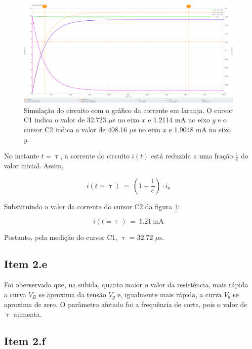 \documentclass[11pt]{article}
\begin{document}
\begin{figure}[h!]
  \centering
  \includegraphics[width=\textwidth]{fig/2-d}
  \caption{Simulação do circuito com o gráfico da corrente em laranja. O cursor C1 indica o valor de 32.723 $\mu$s no eixo $x$ e 1.2114 mA no eixo $y$ e o cursor C2 indica o valor de 408.16 $\mu$s no eixo $x$ e 1.9048 mA no eixo $y$.}
  \label{fig:2-d}
\end{figure}

No instante $t = \uptau$, a corrente do circuito $i(t)$ está reduzida a uma fração $\frac{1}{e}$ do valor inicial. Assim,

$$
  i(t\!=\!\uptau) \:=\: \left( 1 - \frac{1}{e} \right) \cdot i_{o}
$$

Substituindo o valor da corrente do cursor C2 da figura \ref{fig:2-d}:

$$
  i(t\!=\!\uptau) \:=\: 1.21\ \text{mA}
$$

Portanto, pela medição do cursor C1, $\uptau$ = 32.72 $\mu$s.

\subsection*{Item 2.e}

Foi oberservado que, na subida, quanto maior o valor da resistência, mais rápida a curva $V_{R}$ se aproxima da tensão $V_{g}$ e, igualmente mais rápida, a curva $V_{b}$ se aproxima de zero. O parâmetro afetado foi a frequência de corte, pois o valor de $\uptau$ aumenta.

\pagebreak

\subsection*{Item 2.f}
\end{document}
